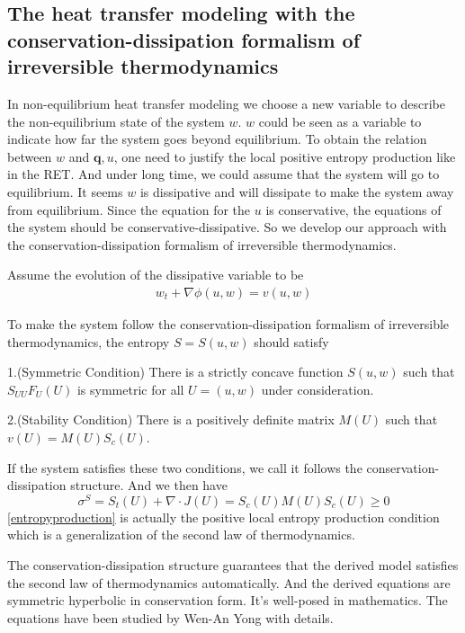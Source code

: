 \documentclass[a4paper]{article}
\begin{document}
\subsection{The  heat transfer modeling with the conservation-dissipation formalism of irreversible thermodynamics}
In non-equilibrium heat transfer modeling we choose a new variable to describe the non-equilibrium state of the system $w$. $w$ could be seen as a variable to indicate how far the system goes beyond equilibrium. To obtain the relation between $w$ and $\mathbf{q},u$, one need to justify the local positive entropy production like in the RET. And under long time, we could assume that the system will go to equilibrium. It seems $w$ is dissipative and will dissipate to make the system away from equilibrium. Since the equation for the $u$ is conservative, the equations of the system should be conservative-dissipative. So we develop our approach with the conservation-dissipation formalism of irreversible thermodynamics.

Assume the evolution of the dissipative variable to be
\begin{eqnarray}
w_t+\nabla \phi(u,w)=v(u,w)
\end{eqnarray}

To make the system follow the conservation-dissipation formalism of irreversible thermodynamics, the entropy $S = S(u,w)$ should satisfy

1.(Symmetric Condition) There is a strictly concave function $S(u,w)$ such that $S_{UU} F_U(U)$ is symmetric for all $U=(u,w)$ under consideration.

2.(Stability Condition) There is a positively definite matrix $M(U)$ such that $v(U)=M(U)S_c(U)$.

If the system satisfies these two conditions, we call it follows the conservation-dissipation structure. And we then have
\begin{equation}\label{entropyproduction}
\sigma^{S}=S_t(U)+\nabla \cdot J(U)=S_c(U)M(U)S_c(U) \ge 0
\end{equation}
\eqref{entropyproduction} is actually the positive local entropy production condition which is a generalization of the second law of thermodynamics.

The  conservation-dissipation structure guarantees that the derived model satisfies the second law of thermodynamics automatically. And the derived equations are symmetric hyperbolic in conservation form. It's well-posed in mathematics\cite{friedrichs1971systems}. The equations have been studied by Wen-An Yong with details\cite{yong2008interesting,yong1999singular,kawashima2004dissipative}.
\end{document}
